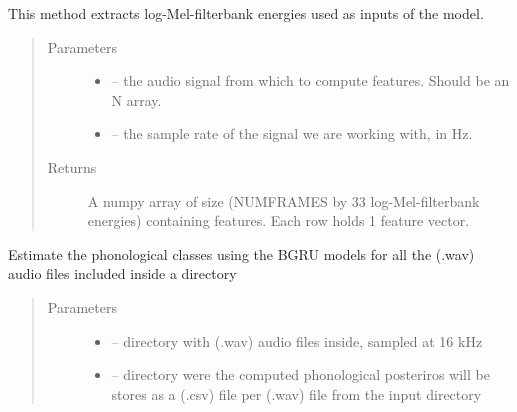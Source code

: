 \documentclass[letterpaper,10pt,english]{sphinxmanual}
\begin{document}
\begin{fulllineitems}
\begin{fulllineitems}
\label{\detokenize{index:phonet.Phonet.get_feat}}
This method extracts log-Mel-filterbank energies used as inputs
of the model.
\begin{quote}\begin{description}
\item[{Parameters}] \leavevmode\begin{itemize}
\item {} 
 -- the audio signal from which to compute features. Should be an N array.

\item {} 
 -- the sample rate of the signal we are working with, in Hz.

\end{itemize}

\item[{Returns}] \leavevmode
A numpy array of size (NUMFRAMES by 33 log-Mel-filterbank energies) containing features. Each row holds 1 feature vector.

\end{description}\end{quote}

\end{fulllineitems}


\begin{fulllineitems}
\label{\detokenize{index:phonet.Phonet.get_phon_path}}
Estimate the phonological classes using the BGRU models for all the (.wav) audio files included inside a directory
\begin{quote}\begin{description}
\item[{Parameters}] \leavevmode\begin{itemize}
\item {} 
 -- directory with (.wav) audio files inside, sampled at 16 kHz

\item {} 
 -- directory were the computed phonological posteriros will be stores as a (.csv) file per (.wav) file from the input directory


\end{itemize}
\end{description}
\end{quote}
\end{fulllineitems}
\end{fulllineitems}
\end{document}
